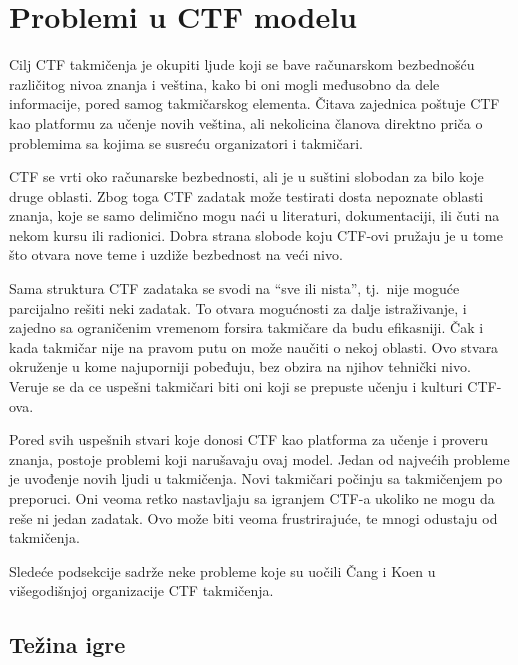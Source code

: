 \documentclass[12pt, a4paper, twocolumn]{article}
\begin{document}
\section{Problemi u CTF modelu}

Cilj CTF takmičenja je okupiti ljude koji se bave računarskom bezbednošću
različitog nivoa znanja i veština, kako bi oni mogli međusobno da dele
informacije, pored samog takmičarskog elementa. Čitava zajednica poštuje
CTF kao platformu za učenje novih veština, ali nekolicina članova direktno
priča o problemima sa kojima se susreću organizatori i takmičari.

CTF se vrti oko računarske bezbednosti, ali je u suštini slobodan za bilo koje
druge oblasti. Zbog toga CTF zadatak može testirati dosta nepoznate oblasti 
znanja, koje se samo delimično mogu naći u literaturi, dokumentaciji, ili čuti 
na nekom kursu ili radionici. Dobra strana slobode koju CTF-ovi pružaju je u 
tome što otvara nove teme i uzdiže bezbednost na veći nivo. 

Sama struktura CTF zadataka se svodi na ``sve ili nista'', tj.\ nije moguće
parcijalno rešiti neki zadatak. To otvara mogućnosti za dalje istraživanje, i
zajedno sa ograničenim vremenom forsira takmičare da budu efikasniji. Čak i
kada takmičar nije na pravom putu on može naučiti o nekoj oblasti. Ovo stvara
okruženje u kome najuporniji pobeđuju, bez obzira na njihov tehnički nivo.
Veruje se da ce uspešni takmičari biti oni koji se prepuste učenju i kulturi
CTF-ova.

Pored svih uspešnih stvari koje donosi CTF kao platforma za učenje i proveru
znanja, postoje problemi koji narušavaju ovaj model. Jedan od najvećih
probleme je uvođenje novih ljudi u takmičenja.\cite{ctf_chung} Novi takmičari
počinju sa takmičenjem po preporuci. Oni veoma retko nastavljaju sa igranjem
CTF-a ukoliko ne mogu da reše ni jedan zadatak. Ovo može biti veoma 
frustrirajuće, te mnogi odustaju od takmičenja.

Sledeće podsekcije sadrže neke probleme koje su uočili Čang i Koen 
\cite{ctf_chung} u višegodišnjoj organizacije CTF takmičenja.

\subsection{Težina igre}
\end{document}
